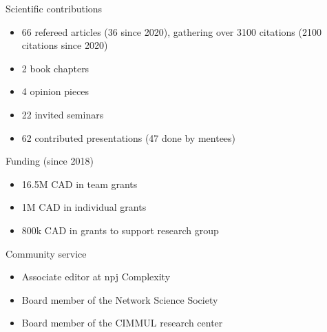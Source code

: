 \documentclass[10pt]{article}
\begin{document}
\vspace*{0.25\baselineskip}
\begin{minipage}[t]{0.56\textwidth}
  {\large\color{monbleu}Scientific contributions}
  \begin{itemize}
    \item 66 refereed articles (36 since 2020), gathering over 3100 citations (2100 citations since 2020)
    \item 2 book chapters
    \item 4 opinion pieces
    \item 22 invited seminars
    \item 62 contributed presentations (47 done by mentees)
  \end{itemize}
\end{minipage}
\hfill
\begin{minipage}[t]{0.42\textwidth}
  {\large\color{monbleu}Funding (since 2018)}
  \begin{itemize}
    \item 16.5M CAD in team grants
    \item 1M CAD in individual grants
    \item 800k CAD in grants to support research group
  \end{itemize}
  {\large\color{monbleu}Community service}
  \begin{itemize}
    \item Associate editor at npj Complexity
    \item Board member of the Network Science Society
    \item Board member of the CIMMUL research center
  \end{itemize}
\end{minipage}
\end{document}
